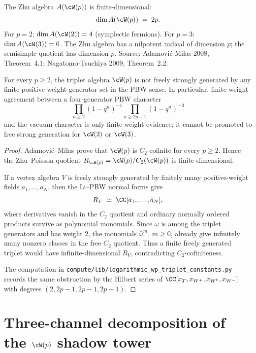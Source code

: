\begin{proposition}
\label{prop:wp-zhu-finite}
The Zhu algebra $A(\cW(p))$ is finite-dimensional:
\[
 \dim A(\cW(p)) \;=\; 2 p.
\]
For $p = 2$: $\dim A(\cW(2)) = 4$ (symplectic fermions). For $p = 3$:
$\dim A(\cW(3)) = 6$. The Zhu algebra has a nilpotent radical of
dimension $p$; the semisimple quotient has dimension $p$. Source:
Adamovi\'c-Milas 2008, Theorem~4.1; Nagatomo-Tsuchiya 2009,
Theorem~2.2.
\end{proposition}

\begin{proposition}
\label{prop:wp-c2-forbids-finite-free-strong-generation}
For every $p \ge 2$, the triplet algebra $\cW(p)$ is not freely
strongly generated by any finite positive-weight generator set in the
PBW sense. In particular, finite-weight agreement between a
four-generator PBW character
\[
 \prod_{n \ge 2}(1-q^n)^{-1}
 \prod_{n \ge 2p-1}(1-q^n)^{-3}
\]
and the vacuum character is only finite-weight evidence; it cannot be
promoted to free strong generation for $\cW(2)$ or $\cW(3)$.
\end{proposition}

\begin{proof}
Adamovi\'c--Milas prove that $\cW(p)$ is $C_2$-cofinite for every
$p \ge 2$. Hence the Zhu--Poisson quotient
$R_{\cW(p)}=\cW(p)/C_2(\cW(p))$ is finite-dimensional.

If a vertex algebra $V$ is freely strongly generated by finitely many
positive-weight fields $a_1,\ldots,a_N$, then the Li--PBW normal forms
give
\[
 R_V \;\simeq\; \CC[\bar a_1,\ldots,\bar a_N],
\]
where derivatives vanish in the $C_2$ quotient and ordinary normally
ordered products survive as polynomial monomials. Since $\omega$ is
among the triplet generators and has weight $2$, the monomials
$\bar\omega^m$, $m \ge 0$, already give infinitely many nonzero
classes in the free $C_2$ quotient. Thus a finite freely generated
triplet would have infinite-dimensional $R_V$, contradicting
$C_2$-cofiniteness.

The computation in
\texttt{compute/lib/logarithmic\_wp\_triplet\_constants.py} records the
same obstruction by the Hilbert series of
$\CC[x_T,x_{W^+},x_{W^0},x_{W^-}]$ with degrees
$(2,2p-1,2p-1,2p-1)$.
\end{proof}

\section{Three-channel decomposition of the $\cW(p)$ shadow tower}
\label{sec:wp-three-channel}


